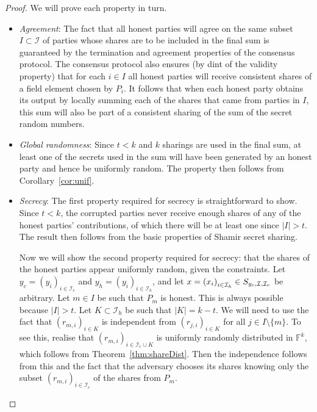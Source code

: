 \documentclass{article}
\theoremstyle{remark}
\newcommand{\F}{\mathbb{F}}
\begin{document}
\begin{proof}
	We will prove each property in turn.

	\begin{itemize}
		\item \textit{Agreement}: The fact that all honest parties will agree
			on the same subset $I \subset \mathcal{I}$ of parties whose shares
			are to be included in the final sum is guaranteed by the
			termination and agreement properties of the consensus protocol. The
			consensus protocol also ensures (by dint of the validity property)
			that for each $i \in I$ all honest parties will receive consistent
			shares of a field element chosen by $P_i$. It follows that when
			each honest party obtains its output by locally summing each of the
			shares that came from parties in $I$, this sum will also be part of
			a consistent sharing of the sum of the secret random numbers.

		\item \textit{Global randomness}: Since $t < k$ and $k$ sharings are
			used in the final sum, at least one of the secrets used in the sum
			will have been generated by an honest party and hence be uniformly
			random. The property then follows from Corollary~\ref{cor:unif}.

		\item \textit{Secrecy}: The first property required for secrecy is
			straightforward to show. Since $t < k$, the corrupted parties never
			receive enough shares of any of the honest parties' contributions,
			of which there will be at least one since $|I| > t$. The result
			then follows from the basic properties of Shamir secret sharing.
			
			Now we will show the second property required for secrecy: that the
			shares of the honest parties appear uniformly random, given the
			constraints. Let
			$y_c = {(y_i)}_{i \in \mathcal{I}_c}$
			and
			$y_h = {(y_i)}_{i \in \mathcal{I}_h}$,
			and let
			$x = {(x_i)}_{i \in \mathcal{I}_h}
			\in
			S_{y_c, \mathcal{I}, \mathcal{I}_c}$
			be arbitrary. Let $m \in I$ be such that $P_m$ is honest. This is
			always possible because $|I| > t$. Let
			$K \subset \mathcal{I}_h$
			be such that $|K| = k - t$. We will need to use the fact that
			${(r_{m, i})}_{i \in K}$
			is independent from
			${(r_{j, i})}_{i \in K}$
			for all $j \in I \setminus \{m\}$. To see this, realise that
			${(r_{m, i})}_{i \in \mathcal{I}_c \cup K}$
			is uniformly randomly distributed in $\F^k$, which follows
			from Theorem~\ref{thm:shareDist}. Then the independence follows
			from this and the fact that the adversary chooses its shares
			knowing only the subset
			${(r_{m, i})}_{i \in \mathcal{I}_c}$
			of the shares from $P_m$.


\end{itemize}
\end{proof}
\end{document}
